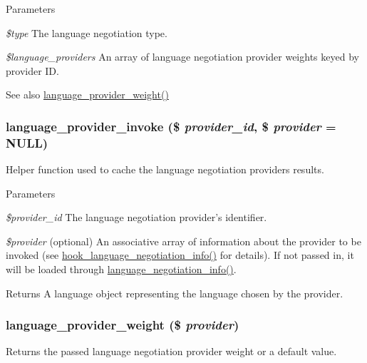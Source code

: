 \begin{DoxyParams}{Parameters}
\item[{\em \$type}]The language negotiation type. \item[{\em \$language\_\-providers}]An array of language negotiation provider weights keyed by provider ID. \end{DoxyParams}
\begin{DoxySeeAlso}{See also}
\hyperlink{group__language__negotiation_ga6ab68f6fac82e1ae755c06787b042a39}{language\_\-provider\_\-weight()} 
\end{DoxySeeAlso}
\hypertarget{group__language__negotiation_ga031f4e0102fa2365a45709ff6935fee2}{
\subsubsection[{language\_\-provider\_\-invoke}]{\setlength{\rightskip}{0pt plus 5cm}language\_\-provider\_\-invoke (\$ {\em provider\_\-id}, \/  \$ {\em provider} = {\ttfamily NULL})}}
\label{group__language__negotiation_ga031f4e0102fa2365a45709ff6935fee2}
Helper function used to cache the language negotiation providers results.


\begin{DoxyParams}{Parameters}
\item[{\em \$provider\_\-id}]The language negotiation provider's identifier. \item[{\em \$provider}](optional) An associative array of information about the provider to be invoked (see \hyperlink{group__language__negotiation_gabcac4b239272ba30c6320a0af2fab46e}{hook\_\-language\_\-negotiation\_\-info()} for details). If not passed in, it will be loaded through \hyperlink{group__language__negotiation_ga5e41e506c539a01a4ee945857c526e78}{language\_\-negotiation\_\-info()}.\end{DoxyParams}
\begin{DoxyReturn}{Returns}
A language object representing the language chosen by the provider. 
\end{DoxyReturn}
\hypertarget{group__language__negotiation_ga6ab68f6fac82e1ae755c06787b042a39}{
\subsubsection[{language\_\-provider\_\-weight}]{\setlength{\rightskip}{0pt plus 5cm}language\_\-provider\_\-weight (\$ {\em provider})}}
\label{group__language__negotiation_ga6ab68f6fac82e1ae755c06787b042a39}
Returns the passed language negotiation provider weight or a default value.


